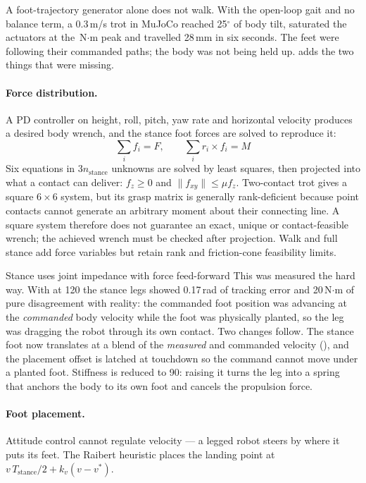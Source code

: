 \documentclass[11pt,a4paper]{article}
\begin{document}
A foot-trajectory generator alone does not walk. With the open-loop gait and no
balance term, a 0.3\,m/s trot in MuJoCo reached 25$^\circ$ of body tilt,
saturated the actuators at the \RdTorquePeak\,N$\cdot$m peak and travelled
28\,mm in six seconds. The feet were following their commanded paths; the body
was not being held up.  adds the two things that were missing.

\paragraph{Force distribution.} A PD controller on height, roll, pitch, yaw rate
and horizontal velocity produces a desired body wrench, and the stance foot
forces are solved to reproduce it:
\[
\sum_i f_i = F, \qquad \sum_i r_i \times f_i = M
\]
Six equations in $3 n_{\mathrm{stance}}$ unknowns are solved by least squares,
then projected into what a contact can deliver: $f_z \ge 0$ and
$\lVert f_{xy} \rVert \le \mu f_z$. Two-contact trot gives a square $6\times6$
system, but its grasp matrix is generally rank-deficient because point contacts
cannot generate an arbitrary moment about their connecting line. A square
system therefore does not guarantee an exact, unique or contact-feasible wrench;
the achieved wrench must be checked after projection. Walk and full stance add
force variables but retain rank and friction-cone feasibility limits.

\begin{decision}{Stance uses joint impedance with force feed-forward}
This was measured the hard way. With  at 120 the stance legs
showed 0.17\,rad of tracking error and 20\,N$\cdot$m of pure disagreement with
reality: the commanded foot position was advancing at the \emph{commanded} body
velocity while the foot was physically planted, so the leg was dragging the
robot through its own contact. Two changes follow. The stance foot now
translates at a blend of the \emph{measured} and commanded velocity
(), and the placement offset is latched at touchdown
so the command cannot move under a planted foot. Stiffness is reduced to 90:
raising it turns the leg into a spring that anchors the body to its own foot
and cancels the propulsion force.
\end{decision}

\paragraph{Foot placement.} Attitude control cannot regulate velocity --- a
legged robot steers by where it puts its feet. The Raibert heuristic places the
landing point at $v\,T_{\mathrm{stance}}/2 + k_v (v - v^{*})$.
\end{document}
